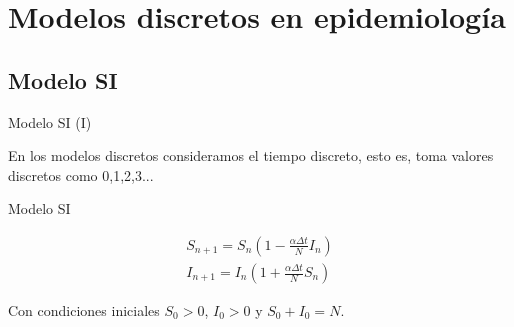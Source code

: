 

\section{Modelos discretos en epidemiología}


\subsection{Modelo SI}


\begin{frame}{Modelo SI (I)}

    En los modelos discretos consideramos el tiempo discreto, esto es, toma valores discretos como 0,1,2,3...

    \pause

    \begin{block}{Modelo SI  \cite{allenDiscretetimeSISIR1994}\cite{brauerMathematicalModelsPopulation2012}\cite{salinelliDiscreteDynamicalModels2014}}

        \begin{equation}
        \label{eqn: SI}
        \begin{aligned}
        S_{n+1}=S_n\left( 1-\frac{\alpha\Delta t}{N}I_n\right) \\
        I_{n+1}=I_n\left( 1+\frac{\alpha\Delta t}{N}S_n\right)
        \end{aligned}
        \end{equation}

        Con condiciones iniciales $S_0>0$, $I_0>0$ y $S_0+I_0=N$.      

    \end{block}  

    \begin{center}
    \end{center}

\end{frame}

